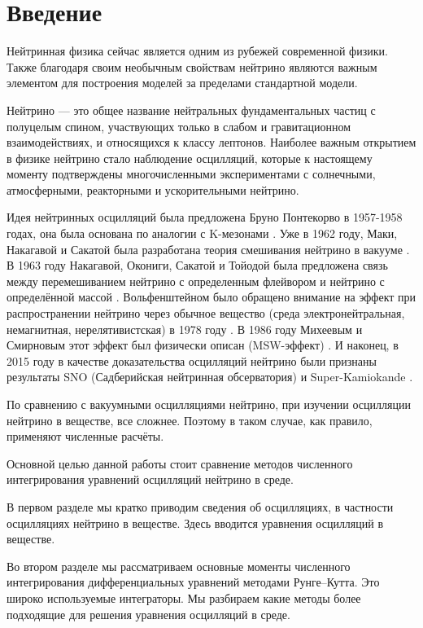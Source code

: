 \documentclass[a4paper,12pt]{article}
\begin{document}
\setcounter{page}{2}

\thispagestyle{empty}
\tableofcontents

\newpage

	\section*{Введение}
Нейтринная физика сейчас является одним из рубежей современной физики. Также благодаря своим необычным свойствам нейтрино являются важным элементом для построения моделей за пределами стандартной модели.

Нейтрино --- это общее название нейтральных фундаментальных частиц с полуцелым спином, участвующих только в слабом и гравитационном взаимодействиях, и относящихся к классу лептонов. Наиболее важным открытием в физике нейтрино стало наблюдение осцилляций, которые к настоящему моменту подтверждены многочисленными экспериментами с солнечными, атмосферными, реакторными и ускорительными нейтрино.

Идея нейтринных осцилляций была предложена Бруно Понтекорво в 1957-1958 годах, она была основана по аналогии с K-мезонами \cite{11, 22}. Уже в 1962 году, Маки, Накагавой и Сакатой была разработана теория смешивания нейтрино в вакууме \cite{33}. В 1963 году Накагавой, Окониги, Сакатой и Тойодой была предложена связь между перемешиванием нейтрино с определенным флейвором и нейтрино с определённой массой \cite{44}. Вольфенштейном было обращено внимание на эффект при распространении нейтрино через обычное вещество (среда электронейтральная, немагнитная, нерелятивистская) в 1978 году \cite{55, 66}. В 1986 году Михеевым и Смирновым этот эффект был физически описан (MSW-эффект) \cite{77, 88}. И наконец, в 2015 году в качестве доказательства осцилляций нейтрино были признаны результаты SNO (Садберийская нейтринная обсерватория) \cite{99} и Super-Kamiokande \cite{1010}.

По сравнению с вакуумными осцилляциями нейтрино, при изучении осцилляции нейтрино в веществе, все сложнее. Поэтому в таком случае, как правило, применяют численные расчёты.

Основной целью данной работы стоит сравнение методов численного интегрирования уравнений осцилляций нейтрино в среде.

В первом разделе мы кратко приводим сведения об осцилляциях, в частности осцилляциях нейтрино в веществе. Здесь вводится уравнения осцилляций в веществе.

Во втором разделе мы рассматриваем основные моменты численного интегрирования дифференциальных уравнений методами Рунге--Кутта. Это широко используемые интеграторы. Мы разбираем какие методы более подходящие для решения уравнения осцилляций в среде.
\end{document}
